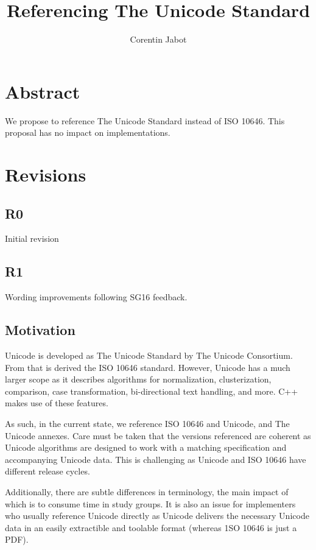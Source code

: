 \documentclass{wg21}
\title{Referencing The Unicode Standard}
\author{Corentin Jabot}{corentin.jabot@gmail.com}
\begin{document}
\maketitle

\section{Abstract}

We propose to reference The Unicode Standard instead of ISO 10646.
This proposal has no impact on implementations.

\section{Revisions}

\subsection{R0}

Initial revision

\subsection{R1}

Wording improvements following SG16 feedback.

\subsection{Motivation}

Unicode is developed as The Unicode Standard by The Unicode Consortium.
From that is derived the ISO 10646 standard.
However, Unicode has a much larger scope as it describes algorithms for normalization,
clusterization, comparison, case transformation, bi-directional text handling, and more.
C++ makes use of these features.

As such, in the current state, we reference ISO 10646 and Unicode, and The Unicode annexes.
Care must be taken that the versions referenced are coherent as Unicode algorithms
are designed to work with a matching specification and accompanying Unicode data.
This is challenging as Unicode and ISO 10646 have different release cycles.

Additionally, there are subtle differences in terminology, the main impact of which
is to consume time in study groups.
It is also an issue for implementers who usually reference
Unicode directly as Unicode delivers the necessary Unicode data in an easily extractible
and toolable format (whereas 1SO 10646 is just a PDF).
\end{document}
